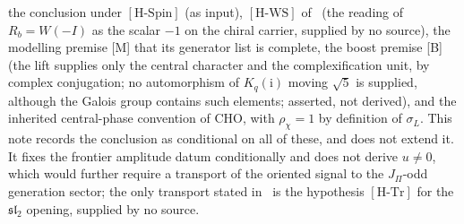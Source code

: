 \documentclass[11pt,a4paper]{article}
\theoremstyle{definition}
\newcommand{\HSpin}{\ensuremath{[\mathrm{H\text{-}Spin}]}}
\newcommand{\HTr}{\ensuremath{[\mathrm{H\text{-}Tr}]}}
\newcommand{\HWS}{\ensuremath{[\mathrm{H\text{-}WS}]}}
\begin{document}
      the conclusion under \HSpin{} (as input), \HWS{} of~\cite{Beau2026q11of} (the reading of $R_b=W(-I)$ as the scalar
      $-1$ on the chiral carrier, supplied by no source), the modelling premise [M] that its generator list is
      complete, the boost premise [B] (the lift supplies only the central character and the complexification unit, by
      complex conjugation; no automorphism of $K_q(\mathrm{i})$ moving $\sqrt5$ is supplied, although the Galois group
      contains such elements; asserted, not derived), and the inherited central-phase convention of CHO, with $\rho_\chi=1$ by definition of $\sigma_L$.
      This note records the conclusion as conditional on all of these, and does not extend it.
      It fixes the frontier amplitude datum conditionally and does not derive $u\neq0$, which would further require a
      transport of the oriented signal to the $J_\Pi$-odd generation sector; the only transport stated
      in~\cite{Beau2026prs} is the hypothesis \HTr{} for the $\mathfrak{sl}_2$ opening, supplied by no source.
\end{document}
